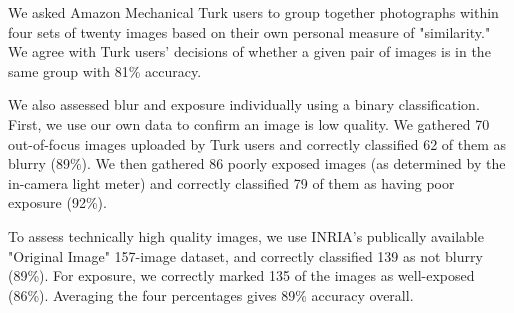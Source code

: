 \documentclass{article}
\begin{document}

We asked Amazon Mechanical Turk users to group together photographs within four sets of twenty images based on their own personal measure of "similarity." We agree with Turk users' decisions of whether a given pair of images is in the same group with 81\% accuracy.

We also assessed blur and exposure individually using a binary classification. First, we use our own data to confirm an image is low quality. We gathered 70 out-of-focus images uploaded by Turk users and correctly classified 62 of them as blurry (89\%). We then gathered 86 poorly exposed images (as determined by the in-camera light meter) and correctly classified 79 of them as having poor exposure (92\%).

To assess technically high quality images, we use INRIA's publically available "Original Image" 157-image dataset\cite{JDS08}, and correctly classified 139 as not blurry (89\%). For exposure, we correctly marked 135 of the images as well-exposed (86\%). Averaging the four percentages gives 89\% accuracy overall.



\end{document}
